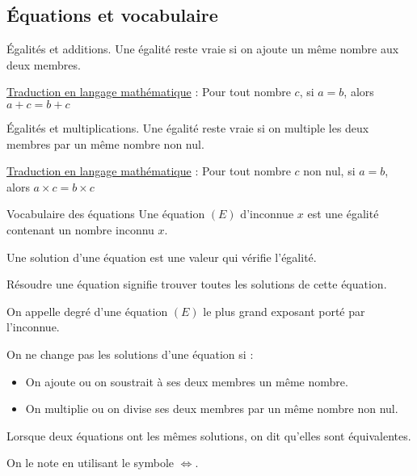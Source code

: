 \begin{pageCours} %


\section{Équations et vocabulaire}

\begin{PpT}{Égalités et additions.}
Une égalité reste vraie si on ajoute un même nombre aux deux membres.

\underline{Traduction en langage mathématique} :  Pour tout nombre $c$, si $a=b$, alors $a+c=b+c$
\end{PpT}

\begin{PpT}{Égalités et multiplications.}
Une égalité reste vraie si on multiple les deux membres par un même nombre non nul.

\underline{Traduction en langage mathématique} :  Pour tout nombre $c$ non nul, si $a=b$, alors $a\times c=b\times c$ 
\end{PpT}

\begin{DefT}{Vocabulaire des équations}
Une équation $(E)$ d'inconnue $x$ est une égalité contenant un nombre inconnu $x$.

Une solution d'une équation est une valeur qui vérifie l'égalité.

Résoudre une équation signifie trouver toutes les solutions de cette équation.
\end{DefT}

\begin{Def}
On appelle degré d'une équation $(E)$ le plus grand exposant porté par l'inconnue.
\end{Def}

\begin{Pp}
On ne change pas les solutions d'une équation si :
\begin{itemize}
\item On ajoute ou on soustrait à ses deux membres un même nombre.
\item On multiplie ou on divise ses deux membres par un même nombre non nul.
\end{itemize}
\end{Pp}

\begin{Def}
Lorsque deux équations ont les mêmes solutions, on dit qu'elles sont équivalentes.

On le note en utilisant le symbole $\Leftrightarrow$.
\end{Def}

\end{pageCours} %


